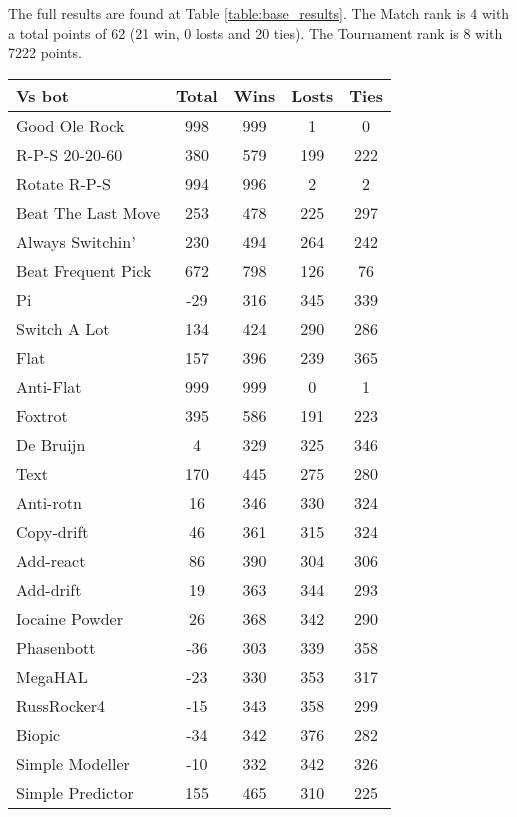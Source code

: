 The full results are found at Table \ref{table:base_results}. The Match rank is 4 with a total points of 62 (21 win, 0 losts and 20 ties). The Tournament rank is 8 with 7222 points.

\begin{table*}
    \caption{Baseline results}
    \label{table:base_results}
    \centering
    \begin{tabular}{|l|c|c|c|c|}
        \hline
        \textbf{Vs bot} & \textbf{Total} & \textbf{Wins} & \textbf{Losts} & \textbf{Ties} \\ \hline
Good Ole Rock & 998 & 999 & 1 & 0 \\ \hline 
R-P-S 20-20-60 & 380 & 579 & 199 & 222 \\ \hline 
Rotate R-P-S & 994 & 996 & 2 & 2 \\ \hline 
Beat The Last Move & 253 & 478 & 225 & 297 \\ \hline 
Always Switchin' & 230 & 494 & 264 & 242 \\ \hline 
Beat Frequent Pick & 672 & 798 & 126 & 76 \\ \hline 
Pi & -29 & 316 & 345 & 339 \\ \hline 
Switch A Lot & 134 & 424 & 290 & 286 \\ \hline 
Flat & 157 & 396 & 239 & 365 \\ \hline 
Anti-Flat & 999 & 999 & 0 & 1 \\ \hline 
Foxtrot & 395 & 586 & 191 & 223 \\ \hline 
De Bruijn & 4 & 329 & 325 & 346 \\ \hline 
Text & 170 & 445 & 275 & 280 \\ \hline 
Anti-rotn & 16 & 346 & 330 & 324 \\ \hline 
Copy-drift & 46 & 361 & 315 & 324 \\ \hline 
Add-react & 86 & 390 & 304 & 306 \\ \hline 
Add-drift & 19 & 363 & 344 & 293 \\ \hline 
Iocaine Powder & 26 & 368 & 342 & 290 \\ \hline 
Phasenbott & -36 & 303 & 339 & 358 \\ \hline 
MegaHAL & -23 & 330 & 353 & 317 \\ \hline 
RussRocker4 & -15 & 343 & 358 & 299 \\ \hline 
Biopic & -34 & 342 & 376 & 282 \\ \hline 
Simple Modeller & -10 & 332 & 342 & 326 \\ \hline 
Simple Predictor & 155 & 465 & 310 & 225 \\ \hline 

\end{tabular}
\end{table*}
